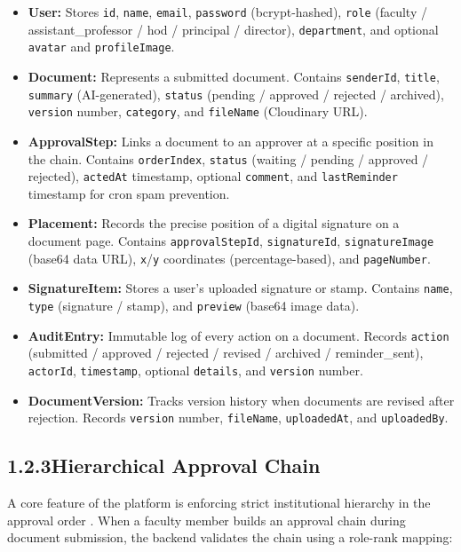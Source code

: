 \documentclass[12pt,a4paper]{report}
\newcommand{\citeref}[1]{%
  \textcolor{citeborder}{%
    \fboxsep=2pt%
    \fcolorbox{citeborder}{citebg}{\footnotesize\bfseries[#1]}%
  }%
}
\begin{document}
\begin{itemize}
    \item \textbf{User:} Stores \texttt{id}, \texttt{name}, \texttt{email}, \texttt{password} (bcrypt-hashed), \texttt{role} (faculty / assistant\_professor / hod / principal / director), \texttt{department}, and optional \texttt{avatar} and \texttt{profileImage}.
    \item \textbf{Document:} Represents a submitted document. Contains \texttt{senderId}, \texttt{title}, \texttt{summary} (AI-generated), \texttt{status} (pending / approved / rejected / archived), \texttt{version} number, \texttt{category}, and \texttt{fileName} (Cloudinary URL).
    \item \textbf{ApprovalStep:} Links a document to an approver at a specific position in the chain. Contains \texttt{orderIndex}, \texttt{status} (waiting / pending / approved / rejected), \texttt{actedAt} timestamp, optional \texttt{comment}, and \texttt{lastReminder} timestamp for cron spam prevention.
    \item \textbf{Placement:} Records the precise position of a digital signature on a document page. Contains \texttt{approvalStepId}, \texttt{signatureId}, \texttt{signatureImage} (base64 data URL), \texttt{x}/\texttt{y} coordinates (percentage-based), and \texttt{pageNumber}.
    \item \textbf{SignatureItem:} Stores a user's uploaded signature or stamp. Contains \texttt{name}, \texttt{type} (signature / stamp), and \texttt{preview} (base64 image data).
    \item \textbf{AuditEntry:} Immutable log of every action on a document. Records \texttt{action} (submitted / approved / rejected / revised / archived / reminder\_sent), \texttt{actorId}, \texttt{timestamp}, optional \texttt{details}, and \texttt{version} number.
    \item \textbf{DocumentVersion:} Tracks version history when documents are revised after rejection. Records \texttt{version} number, \texttt{fileName}, \texttt{uploadedAt}, and \texttt{uploadedBy}.
\end{itemize}

\subsection*{1.2.3\quad Hierarchical Approval Chain}

A core feature of the platform is enforcing strict institutional hierarchy in the approval order \citeref{1}. When a faculty member builds an approval chain during document submission, the backend validates the chain using a role-rank mapping:
\end{document}
